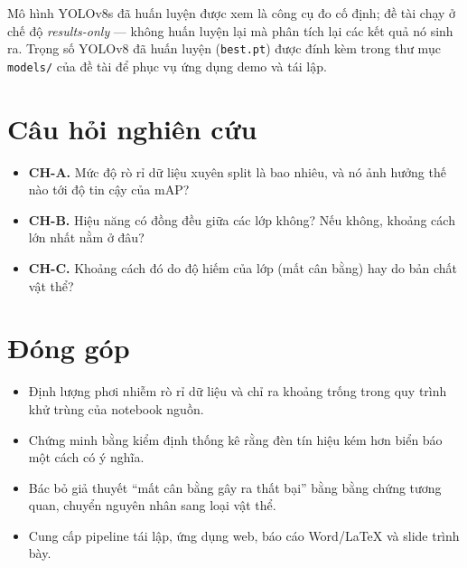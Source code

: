 Mô hình YOLOv8s đã huấn luyện được xem là công cụ đo cố định; đề tài chạy ở chế độ
\textit{results-only} --- không huấn luyện lại mà phân tích lại các kết quả nó sinh ra. Trọng số
YOLOv8 đã huấn luyện (\texttt{best.pt}) được đính kèm trong thư mục \texttt{models/} của đề tài
để phục vụ ứng dụng demo và tái lập.

\section{Câu hỏi nghiên cứu}

\begin{itemize}[leftmargin=1.4cm,label=]
  \item \textbf{CH-A.} Mức độ rò rỉ dữ liệu xuyên split là bao nhiêu, và nó ảnh hưởng thế nào tới
  độ tin cậy của mAP?
  \item \textbf{CH-B.} Hiệu năng có đồng đều giữa các lớp không? Nếu không, khoảng cách lớn nhất
  nằm ở đâu?
  \item \textbf{CH-C.} Khoảng cách đó do độ hiếm của lớp (mất cân bằng) hay do bản chất vật thể?
\end{itemize}

\section{Đóng góp}

\begin{itemize}
  \item Định lượng phơi nhiễm rò rỉ dữ liệu và chỉ ra khoảng trống trong quy trình khử trùng của
  notebook nguồn.
  \item Chứng minh bằng kiểm định thống kê rằng đèn tín hiệu kém hơn biển báo một cách có ý nghĩa.
  \item Bác bỏ giả thuyết ``mất cân bằng gây ra thất bại'' bằng bằng chứng tương quan, chuyển
  nguyên nhân sang loại vật thể.
  \item Cung cấp pipeline tái lập, ứng dụng web, báo cáo Word/LaTeX và slide trình bày.
\end{itemize}

